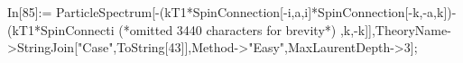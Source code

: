In[85]:= ParticleSpectrum[-(kT1*SpinConnection[-i,a,i]*SpinConnection[-k,-a,k])-(kT1*SpinConnecti (*omitted 3440 characters for brevity*) ,k,-k]],TheoryName->StringJoin["Case",ToString[43]],Method->"Easy",MaxLaurentDepth->3];